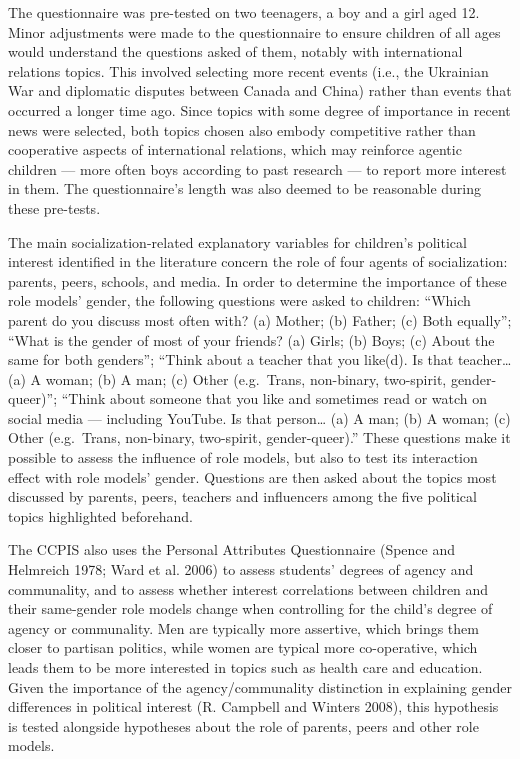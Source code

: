 \documentclass[
  letterpaper,
  DIV=11,
  numbers=noendperiod]{scrreprt}
\begin{document}
The questionnaire was pre-tested on two teenagers, a boy and a girl aged
12. Minor adjustments were made to the questionnaire to ensure children
of all ages would understand the questions asked of them, notably with
international relations topics. This involved selecting more recent
events (i.e., the Ukrainian War and diplomatic disputes between Canada
and China) rather than events that occurred a longer time ago. Since
topics with some degree of importance in recent news were selected, both
topics chosen also embody competitive rather than cooperative aspects of
international relations, which may reinforce agentic children --- more
often boys according to past research --- to report more interest in
them. The questionnaire's length was also deemed to be reasonable during
these pre-tests.

The main socialization-related explanatory variables for children's
political interest identified in the literature concern the role of four
agents of socialization: parents, peers, schools, and media. In order to
determine the importance of these role models' gender, the following
questions were asked to children: ``Which parent do you discuss most
often with? (a) Mother; (b) Father; (c) Both equally''; ``What is the
gender of most of your friends? (a) Girls; (b) Boys; (c) About the same
for both genders''; ``Think about a teacher that you like(d). Is that
teacher\ldots{} (a) A woman; (b) A man; (c) Other (e.g.~Trans,
non-binary, two-spirit, gender-queer)''; ``Think about someone that you
like and sometimes read or watch on social media --- including YouTube.
Is that person\ldots{} (a) A man; (b) A woman; (c) Other (e.g.~Trans,
non-binary, two-spirit, gender-queer).'' These questions make it
possible to assess the influence of role models, but also to test its
interaction effect with role models' gender. Questions are then asked
about the topics most discussed by parents, peers, teachers and
influencers among the five political topics highlighted beforehand.

The CCPIS also uses the Personal Attributes Questionnaire (Spence and
Helmreich 1978; Ward et al. 2006) to assess students' degrees of agency
and communality, and to assess whether interest correlations between
children and their same-gender role models change when controlling for
the child's degree of agency or communality. Men are typically more
assertive, which brings them closer to partisan politics, while women
are typical more co-operative, which leads them to be more interested in
topics such as health care and education. Given the importance of the
agency/communality distinction in explaining gender differences in
political interest (R. Campbell and Winters 2008), this hypothesis is
tested alongside hypotheses about the role of parents, peers and other
role models.
\end{document}
